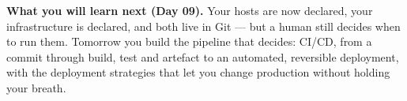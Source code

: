 \begin{keyidea}
\textbf{What you will learn next (Day 09).} Your hosts are now declared, your infrastructure is declared, and both live in Git --- but a human still decides when to run them. Tomorrow you build the pipeline that decides: CI/CD, from a commit through build, test and artefact to an automated, reversible deployment, with the deployment strategies that let you change production without holding your breath.
\end{keyidea}
